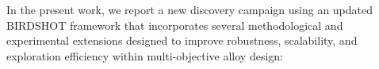 In the present work, we report a new discovery campaign using an updated BIRDSHOT framework that incorporates several methodological and experimental extensions designed to improve robustness, scalability, and exploration efficiency within multi-objective alloy design:








